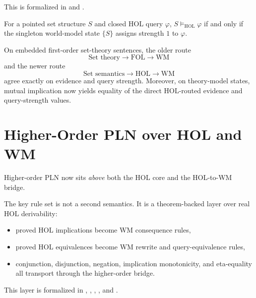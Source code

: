 \documentclass[11pt,openany]{report}
\begin{document}
This is formalized in
 and
.

\begin{theorem}
For a pointed set structure $S$ and closed HOL query $\varphi$,
$S \models_{\mathrm{HOL}} \varphi$ if and only if the singleton world-model
state $\{S\}$ assigns strength $1$ to $\varphi$.
\end{theorem}

On embedded first-order set-theory sentences, the older route
\[
  \text{Set theory} \longrightarrow \text{FOL} \longrightarrow \text{WM}
\]
and the newer route
\[
  \text{Set semantics} \longrightarrow \text{HOL} \longrightarrow \text{WM}
\]
agree exactly on evidence and query strength.  Moreover, on theory-model
states, mutual implication now yields equality of the direct HOL-routed
evidence and query-strength values.

\section{Higher-Order PLN over HOL and WM}

Higher-order PLN now sits \emph{above} both the HOL core and the HOL-to-WM
bridge.

The key rule set is not a second semantics.  It is a theorem-backed layer
over real HOL derivability:
\begin{itemize}
\item proved HOL implications become WM consequence rules,
\item proved HOL equivalences become WM rewrite and query-equivalence rules,
\item conjunction, disjunction, negation, implication monotonicity, and
  eta-equality all transport through the higher-order bridge.
\end{itemize}

This layer is formalized in
,
,
,
, and
.
\end{document}
